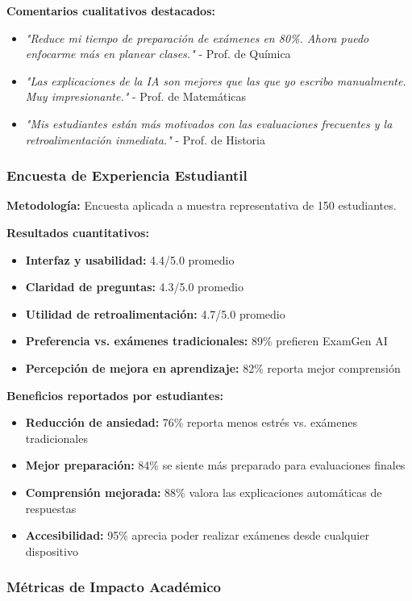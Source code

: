 \documentclass[12pt,a4paper]{report}
\begin{document}
\textbf{Comentarios cualitativos destacados:}
\begin{itemize}
\item \textit{"Reduce mi tiempo de preparación de exámenes en 80\%. Ahora puedo enfocarme más en planear clases."} - Prof. de Química
\item \textit{"Las explicaciones de la IA son mejores que las que yo escribo manualmente. Muy impresionante."} - Prof. de Matemáticas
\item \textit{"Mis estudiantes están más motivados con las evaluaciones frecuentes y la retroalimentación inmediata."} - Prof. de Historia
\end{itemize}

\subsubsection{Encuesta de Experiencia Estudiantil}

\textbf{Metodología:} Encuesta aplicada a muestra representativa de 150 estudiantes.

\textbf{Resultados cuantitativos:}
\begin{itemize}
\item \textbf{Interfaz y usabilidad:} 4.4/5.0 promedio
\item \textbf{Claridad de preguntas:} 4.3/5.0 promedio
\item \textbf{Utilidad de retroalimentación:} 4.7/5.0 promedio
\item \textbf{Preferencia vs. exámenes tradicionales:} 89\% prefieren ExamGen AI
\item \textbf{Percepción de mejora en aprendizaje:} 82\% reporta mejor comprensión
\end{itemize}

\textbf{Beneficios reportados por estudiantes:}
\begin{itemize}
\item \textbf{Reducción de ansiedad:} 76\% reporta menos estrés vs. exámenes tradicionales
\item \textbf{Mejor preparación:} 84\% se siente más preparado para evaluaciones finales
\item \textbf{Comprensión mejorada:} 88\% valora las explicaciones automáticas de respuestas
\item \textbf{Accesibilidad:} 95\% aprecia poder realizar exámenes desde cualquier dispositivo
\end{itemize}

\subsubsection{Métricas de Impacto Académico}
\end{document}
